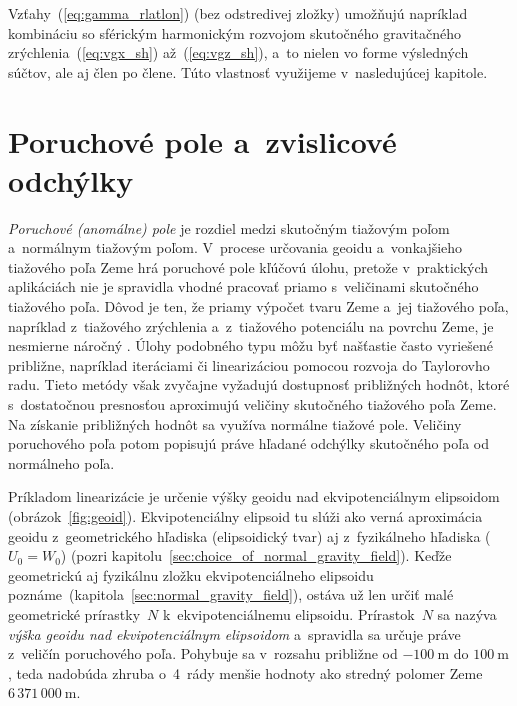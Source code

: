 \documentclass[a4paper, 12pt]{book}
\begin{document}
Vzťahy~(\ref{eq:gamma_rlatlon}) (bez odstredivej zložky) umožňujú napríklad 
kombináciu so sférickým harmonickým rozvojom skutočného gravitačného 
zrýchlenia~(\ref{eq:vgx_sh}) až~(\ref{eq:vgz_sh}), a~to nielen vo forme 
výsledných súčtov, ale aj člen po člene.  Túto vlastnosť využijeme 
v~nasledujúcej kapitole.










\chapter{Poruchové pole a~zvislicové odchýlky}
\label{sec:disturbing_field_deflections}

\emph{Poruchové (anomálne) pole} je rozdiel medzi skutočným tiažovým poľom 
a~normálnym tiažovým poľom.  V~procese určovania geoidu a~vonkajšieho tiažového 
poľa Zeme hrá poruchové pole kľúčovú úlohu, pretože v~praktických aplikáciách 
nie je spravidla vhodné pracovať priamo s~veličinami skutočného tiažového poľa.  
Dôvod je ten, že priamy výpočet tvaru Zeme a~jej tiažového poľa, napríklad 
z~tiažového zrýchlenia a~z~tiažového potenciálu na povrchu Zeme, je nesmierne 
náročný \parencite[pozri 
napríklad][]{Hormander1976,SansoGeodeticBoundaryValueProblem}.  Úlohy podobného 
typu môžu byť našťastie často vyriešené približne, napríklad iteráciami či 
linearizáciou pomocou rozvoja do Taylorovho radu.  Tieto metódy však zvyčajne 
vyžadujú dostupnosť približných hodnôt, ktoré s~dostatočnou presnosťou 
aproximujú veličiny skutočného tiažového poľa Zeme.  Na získanie približných 
hodnôt sa využíva normálne tiažové pole.  Veličiny poruchového poľa potom 
popisujú práve hľadané odchýlky skutočného poľa od normálneho poľa.

Príkladom linearizácie je určenie výšky geoidu nad ekvipotenciálnym elipsoidom 
(obrázok~\ref{fig:geoid}).  Ekvipotenciálny elipsoid tu slúži ako verná 
aproximácia geoidu z~geometrického hľadiska (elipsoidický tvar) aj 
z~fyzikálneho hľadiska ($U_0 = W_0$) (pozri 
kapitolu~\ref{sec:choice_of_normal_gravity_field}).  Keďže geometrickú aj 
fyzikálnu zložku ekvipotenciálneho elipsoidu 
poznáme~(kapitola~\ref{sec:normal_gravity_field}), ostáva už len určiť malé 
geometrické prírastky~$N$ k~ekvipotenciálnemu elipsoidu.  Prírastok~$N$ sa 
nazýva \emph{výška geoidu nad ekvipotenciálnym elipsoidom} a~spravidla sa 
určuje práve z~veličín poruchového poľa.  Pohybuje sa v~rozsahu približne od 
$-100\ \mathrm{m}$ do $100\ \mathrm{m}$, teda nadobúda zhruba o~4~rády menšie 
hodnoty ako stredný polomer Zeme~$6\, 371 \, 000\ \mathrm{m}$.
\end{document}
